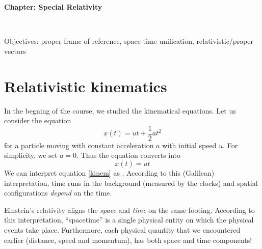 \documentclass[10pt]{article}
\date{2014-6-22}
\begin{document}
\begin{center}
\begin{Large}\textbf{Chapter: Special Relativity}\end{Large} \\
\smallskip
\end{center}
Objectives: proper frame of reference, space-time unification, relativistic/proper vectors
\section{Relativistic kinematics}
In the begning of the course, we studied the kinematical equations.  Let us consider the equation
\begin{equation}
  x(t)=ut+\frac{1}{2}at^2
\end{equation}
for a particle moving with constant acceleration $a$ with initial speed $u$.  For simplicity, we set $a=0$.  Thus the equation converts into
\begin{equation}
\label{kinem}
  x(t)=ut
\end{equation}
We can interpret equation \ref{kinem} as
.  According to this (Galilean) interpretation, time runs in the background (measured by the clocks) and spatial configurations \emph{depend} on the time.

Einstein's relativity aligns the \emph{space} and \emph{time} on the same footing.  According to this interpretation, ``spacetime'' is a single physical entity on which the physical events take place.  Furthermore, each physical quantity that we encountered earlier (distance, speed and momentum), has both space and time components!
\end{document}

